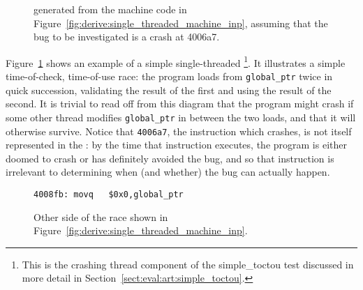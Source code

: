 \begin{figure}
  \caption{{\StateMachine} generated from the machine code in
    Figure~\ref{fig:derive:single_threaded_machine_inp}, assuming that
    the bug to be investigated is a crash at 4006a7.}
  \label{fig:derive:single_threaded_machine}
\end{figure}

Figure~\ref{fig:derive:single_threaded_machine} shows an example of a
simple single-threaded {\StateMachine}\footnote{This is the crashing
  thread component of the simple\_toctou test discussed in more detail
  in Section~\ref{sect:eval:art:simple_toctou}.}.  It illustrates a
simple time-of-check, time-of-use race: the program loads from
\verb|global_ptr| twice in quick succession, validating the result of
the first and using the result of the second.  It is trivial to read
off from this diagram that the program might crash if some other
thread modifies \verb|global_ptr| in between the two loads, and that
it will otherwise survive.  Notice that \verb|4006a7|, the instruction
which crashes, is not itself represented in the {\StateMachine}: by
the time that instruction executes, the program is either doomed to
crash or has definitely avoided the bug, and so that instruction is
irrelevant to determining when (and whether) the bug can actually
happen.

\begin{figure}[t]
\begin{verbatim}
4008fb: movq   $0x0,global_ptr
\end{verbatim}
\caption{Other side of the race shown in
  Figure~\ref{fig:derive:single_threaded_machine_inp}.}
\label{fig:derive:single_threaded_machine_write_inp}
\end{figure}

